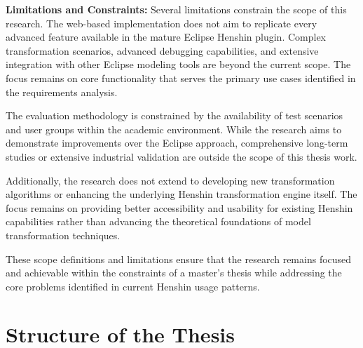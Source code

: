 \textbf{Limitations and Constraints:}
Several limitations constrain the scope of this research. The web-based implementation does not aim to replicate every advanced feature available in the mature Eclipse Henshin plugin. Complex transformation scenarios, advanced debugging capabilities, and extensive integration with other Eclipse modeling tools are beyond the current scope. The focus remains on core functionality that serves the primary use cases identified in the requirements analysis.

The evaluation methodology is constrained by the availability of test scenarios and user groups within the academic environment. While the research aims to demonstrate improvements over the Eclipse approach, comprehensive long-term studies or extensive industrial validation are outside the scope of this thesis work.

Additionally, the research does not extend to developing new transformation algorithms or enhancing the underlying Henshin transformation engine itself. The focus remains on providing better accessibility and usability for existing Henshin capabilities rather than advancing the theoretical foundations of model transformation techniques.

These scope definitions and limitations ensure that the research remains focused and achievable within the constraints of a master's thesis while addressing the core problems identified in current Henshin usage patterns.

\section{Structure of the Thesis}
\label{subsec:structure-thesis}